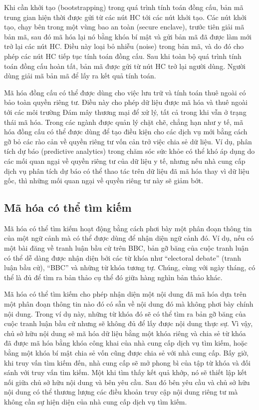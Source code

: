 Khi cần khởi tạo (bootstrapping) trong quá trình tính toán đồng cấu, bản mã trung gian hiện thời được gửi từ các nút HC tới các nút khởi tạo. Các nút khởi tạo, chạy bên trong một vùng bao an toàn (secure enclave), trước tiên giải mã bản mã, sau đó mã hóa lại nó bằng khóa bí mật và gửi bản mã đã được làm mới trở lại các nút HC. Điều này loại bỏ nhiễu (noise) trong bản mã, và do đó cho phép các nút HC tiếp tục tính toán đồng cấu. Sau khi toàn bộ quá trình tính toán đồng cấu hoàn tất, bản mã được gửi từ nút HC trở lại người dùng. Người dùng giải mã bản mã để lấy ra kết quả tính toán.

Mã hóa đồng cấu có thể được dùng cho việc lưu trữ và tính toán thuê ngoài có bảo toàn quyền riêng tư. Điều này cho phép dữ liệu được mã hóa và thuê ngoài tới các môi trường Đám mây thương mại để xử lý, tất cả trong khi vẫn ở trạng thái mã hóa. Trong các ngành được quản lý chặt chẽ, chẳng hạn như y tế, mã hóa đồng cấu có thể được dùng để tạo điều kiện cho các dịch vụ mới bằng cách gỡ bỏ các rào cản về quyền riêng tư vốn cản trở việc chia sẻ dữ liệu. Ví dụ, phân tích dự báo (predictive analytics) trong chăm sóc sức khỏe có thể khó áp dụng do các mối quan ngại về quyền riêng tư của dữ liệu y tế, nhưng nếu nhà cung cấp dịch vụ phân tích dự báo có thể thao tác trên dữ liệu đã mã hóa thay vì dữ liệu gốc, thì những mối quan ngại về quyền riêng tư này sẽ giảm bớt.

\subsection{Mã hóa có thể tìm kiếm}

Mã hóa có thể tìm kiếm hoạt động bằng cách phơi bày một phân đoạn thông tin của một ngữ cảnh mà có thể được dùng để nhận diện ngữ cảnh đó. Ví dụ, nếu có một bài đăng về tranh luận bầu cử trên BBC, bản gỡ băng của cuộc tranh luận có thể dễ dàng được nhận diện bởi các từ khóa như ``electoral debate'' (tranh luận bầu cử), ``BBC'' và những từ khóa tương tự. Chúng, cùng với ngày tháng, có thể là đủ để tìm ra bản thảo cụ thể đó giữa hàng nghìn bản thảo khác.

Mã hóa có thể tìm kiếm cho phép nhận diện một nội dung đã mã hóa dựa trên một phân đoạn thông tin nào đó có sẵn về nội dung đó mà không phơi bày chính nội dung. Trong ví dụ này, những từ khóa đó sẽ có thể tìm ra bản gỡ băng của cuộc tranh luận bầu cử nhưng sẽ không đủ để lấy được nội dung thực sự. Vì vậy, chủ sở hữu nội dung sẽ mã hóa dữ liệu bằng một khóa riêng và chia sẻ từ khóa đã được mã hóa bằng khóa công khai của nhà cung cấp dịch vụ tìm kiếm, hoặc bằng một khóa bí mật chia sẻ vốn cũng được chia sẻ với nhà cung cấp. Bấy giờ, khi truy vấn tìm kiếm đến, nhà cung cấp sẽ mở phong bì của tập từ khóa và đối sánh với truy vấn tìm kiếm. Một khi tìm thấy kết quả khớp, nó sẽ thiết lập kết nối giữa chủ sở hữu nội dung và bên yêu cầu. Sau đó bên yêu cầu và chủ sở hữu nội dung có thể thương lượng các điều khoản truy cập nội dung riêng tư mà không cần sự hiện diện của nhà cung cấp dịch vụ tìm kiếm.

